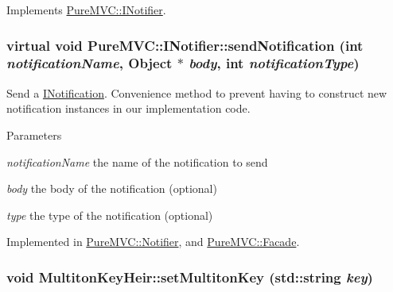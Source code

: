 Implements \hyperlink{class_pure_m_v_c_1_1_i_notifier_a65e8333ccfea74138b79f84dac96af25}{PureMVC::INotifier}.\hypertarget{class_pure_m_v_c_1_1_i_notifier_a65e8333ccfea74138b79f84dac96af25}{
\subsubsection[{sendNotification}]{\setlength{\rightskip}{0pt plus 5cm}virtual void PureMVC::INotifier::sendNotification (int {\em notificationName}, \/  {\bf Object} $\ast$ {\em body}, \/  int {\em notificationType})}}
\label{class_pure_m_v_c_1_1_i_notifier_a65e8333ccfea74138b79f84dac96af25}


Send a {\ttfamily \hyperlink{class_pure_m_v_c_1_1_i_notification}{INotification}}. Convenience method to prevent having to construct new notification instances in our implementation code.


\begin{DoxyParams}{Parameters}
\item[{\em notificationName}]the name of the notification to send \item[{\em body}]the body of the notification (optional) \item[{\em type}]the type of the notification (optional) \end{DoxyParams}


Implemented in \hyperlink{class_pure_m_v_c_1_1_notifier_a55a358ee2661ecc08400653016fdb497}{PureMVC::Notifier}, and \hyperlink{class_pure_m_v_c_1_1_facade_a39a61e0a65d0f979848d36fe99cfd5f5}{PureMVC::Facade}.\hypertarget{class_pure_m_v_c_1_1_multiton_key_heir_abc70ef7c066bc8d7bf0196ec727599bb}{
\subsubsection[{setMultitonKey}]{\setlength{\rightskip}{0pt plus 5cm}void MultitonKeyHeir::setMultitonKey (std::string {\em key})}}
\label{class_pure_m_v_c_1_1_multiton_key_heir_abc70ef7c066bc8d7bf0196ec727599bb}


